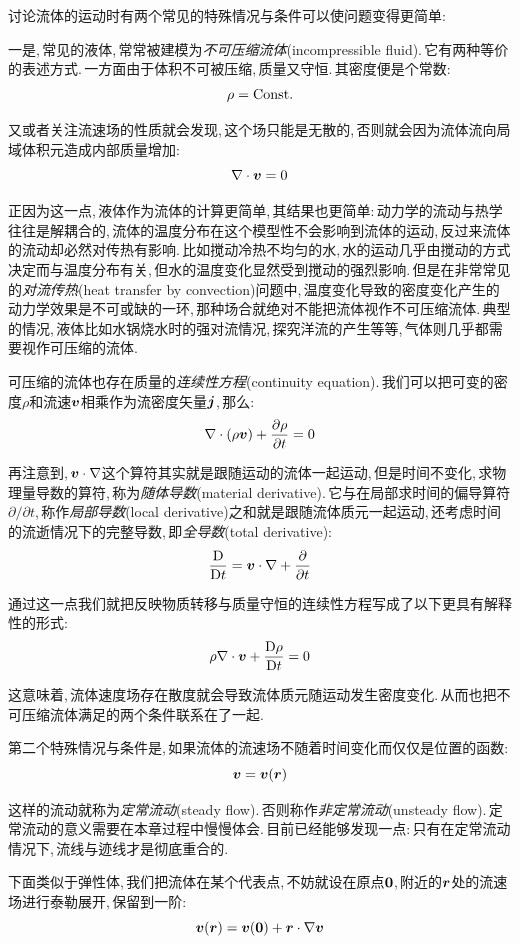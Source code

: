 讨论流体的运动时有两个常见的特殊情况与条件可以使问题变得更简单:

一是,\,常见的液体,\,常常被建模为\emph{不可压缩流体}(incompressible fluid).\,它有两种等价的表述方式.\,一方面由于体积不可被压缩,\,质量又守恒.\,其密度便是个常数:
\[\rho={\rm Const.}\]

又或者关注流速场的性质就会发现,\,这个场只能是无散的,\,否则就会因为流体流向局域体积元造成内部质量增加:
\[\nabla\cdot \boldsymbol{v}=0\]

正因为这一点,\,液体作为流体的计算更简单,\,其结果也更简单:\,动力学的流动与热学往往是解耦合的,\,流体的温度分布在这个模型性不会影响到流体的运动,\,反过来流体的流动却必然对传热有影响.\,比如搅动冷热不均匀的水,\,水的运动几乎由搅动的方式决定而与温度分布有关,\,但水的温度变化显然受到搅动的强烈影响.\,但是在非常常见的\emph{对流传热}(heat transfer by convection)问题中,\,温度变化导致的密度变化产生的动力学效果是不可或缺的一环,\,那种场合就绝对不能把流体视作不可压缩流体.\,典型的情况,\,液体比如水锅烧水时的强对流情况,\,探究洋流的产生等等,\,气体则几乎都需要视作可压缩的流体.

可压缩的流体也存在质量的\emph{连续性方程}(continuity equation).\,我们可以把可变的密度$\rho$和流速$\boldsymbol{v}$相乘作为流密度矢量$\boldsymbol{j}$,\,那么:
\[\nabla\cdot(\rho \boldsymbol{v})+\frac{\partial \rho}{\partial t}=0\]

再注意到,\,$\boldsymbol{v}\cdot\nabla$这个算符其实就是跟随运动的流体一起运动,\,但是时间不变化,\,求物理量导数的算符,\,称为\emph{随体导数}(material derivative).\,它与在局部求时间的偏导算符$\partial/\partial t$,\,称作\emph{局部导数}(local derivative)之和就是跟随流体质元一起运动,\,还考虑时间的流逝情况下的完整导数,\,即\emph{全导数}(total derivative):
\[\frac{\textrm{D}}{\textrm{D} t}=\boldsymbol{v}\cdot\nabla+\frac{\partial}{\partial t}\]

通过这一点我们就把反映物质转移与质量守恒的连续性方程写成了以下更具有解释性的形式:
\[\rho \nabla\cdot \boldsymbol{v}+\frac{\textrm{D} \rho}{\textrm{D} t}=0\]

这意味着,\,流体速度场存在散度就会导致流体质元随运动发生密度变化.\,从而也把不可压缩流体满足的两个条件联系在了一起.

第二个特殊情况与条件是,\,如果流体的流速场不随着时间变化而仅仅是位置的函数:
\[\boldsymbol{v}=\boldsymbol{v}(\boldsymbol{r})\]

这样的流动就称为\emph{定常流动}(steady flow).\,否则称作\emph{非定常流动}(unsteady flow).\,定常流动的意义需要在本章过程中慢慢体会.\,目前已经能够发现一点:\,只有在定常流动情况下,\,流线与迹线才是彻底重合的.

下面类似于弹性体,\,我们把流体在某个代表点,\,不妨就设在原点$\boldsymbol{0}$,\,附近的$\boldsymbol{r}$处的流速场进行泰勒展开,\,保留到一阶:
\[\boldsymbol{v}(\boldsymbol{r})=\boldsymbol{v}(\boldsymbol{0})+\boldsymbol{r}\cdot \nabla \boldsymbol{v}\]

